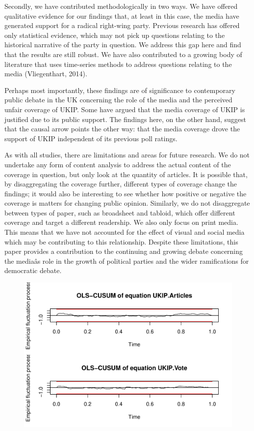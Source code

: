 \documentclass[12pt,article]{article}
\begin{document}
Secondly, we have contributed methodologically in two ways. We have
offered qualitative evidence for our findings that, at least in this
case, the media have generated support for a radical right-wing party.
Previous research has offered only statistical evidence, which may not
pick up questions relating to the historical narrative of the party in
question. We address this gap here and find that the results are still
robust. We have also contributed to a growing body of literature that
uses time-series methods to address questions relating to the media
(Vliegenthart, 2014).

Perhaps most importantly, these findings are of significance to
contemporary public debate in the UK concerning the role of the media
and the perceived unfair coverage of UKIP. Some have argued that the
media coverage of UKIP is justified due to its public support. The
findings here, on the other hand, suggest that the causal arrow points
the other way: that the media coverage drove the support of UKIP
independent of its previous poll ratings.

As with all studies, there are limitations and areas for future
research. We do not undertake any form of content analysis to address
the actual content of the coverage in question, but only look at the
quantity of articles. It is possible that, by disaggregating the
coverage further, different types of coverage change the findings; it
would also be interesting to see whether how positive or negative the
coverage is matters for changing public opinion. Similarly, we do not
disaggregate between types of paper, such as broadsheet and tabloid,
which offer different coverage and target a different readership. We
also only focus on print media. This means that we have not accounted
for the effect of visual and social media which may be contributing to
this relationship. Despite these limitations, this paper provides a
contribution to the continuing and growing debate concerning the
mediaâs role in the growth of political parties and the wider
ramifications for democratic debate.

\pagebreak

\begin{figure}[htbp]
\centering
\includegraphics{ukip_media_files/figure-latex/supplementary-1.pdf}
\caption{}
\end{figure}
\end{document}
